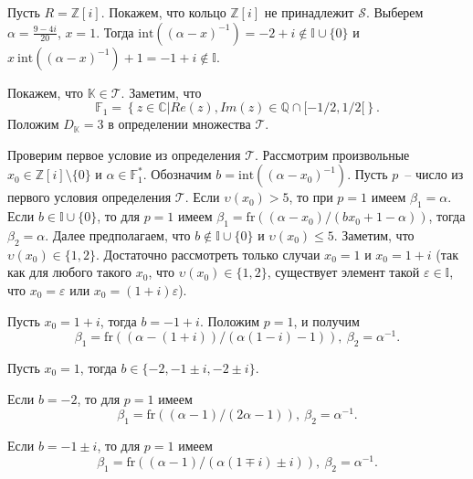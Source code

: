 \documentclass[_00_dissertation.tex]{subfiles}
\begin{document}
\begin{example}\label{example:Z[i]}
    Пусть $R = \mathbb{Z}[i]$.
    Покажем, что кольцо $\mathbb{Z}[i]$ не принадлежит $\mathcal{S}.$
    Выберем $\alpha=\frac{9-4i}{20}$, $x=1$.
    Тогда $\textrm{int}((\alpha-x)^{-1})=-2+i \notin \mathbb{I} \cup \{0\}$ и $x \ \textrm{int}((\alpha-x)^{-1})+1=-1+i \notin \mathbb{I}.$

    Покажем, что $\mathbb{K}\in\mathcal{T}$.
    Заметим, что
    \begin{equation*}
        \mathbb{F}_1 = \left\{
            z \in \mathbb{C} | Re(z), Im(z) \in \mathbb{Q} \cap [-1/2,1/2[
        \right\}.
    \end{equation*}
    Положим $D_{\mathbb{K}}=3$ в определении множества $\mathcal{T}$.

    Проверим первое условие из определения $\mathcal{T}$.
    Рассмотрим произвольные $x_0\in\mathbb{Z}[i]\setminus\{0\}$ и $\alpha\in\mathbb{F}^*_1$.
    Обозначим $b=\textrm{int}((\alpha-x_0)^{-1})$.
    Пусть $p$~-- число из первого условия определения $\mathcal{T}$.
    Если $\upsilon(x_0)>5$, то при $p=1$ имеем $\beta_1=\alpha$.
    Если $b\in\mathbb{I}\cup\{0\}$, то для $p=1$ имеем $\beta_1=\textrm{fr}((\alpha-x_0)/(bx_0+1-\alpha))$, тогда $\beta_2=\alpha$.
    Далее предполагаем, что $b\not\in\mathbb{I}\cup\{0\}$ и $\upsilon(x_0)\le 5$.
    Заметим, что $\upsilon(x_0)\in\{1,2\}$.
    Достаточно рассмотреть только случаи $x_0=1$ и $x_0=1+i$ (так как для любого такого $x_0$, что $\upsilon(x_0)\in\{1,2\}$, существует элемент такой $\varepsilon\in\mathbb{I}$, что $x_0=\varepsilon$ или $x_0=(1+i)\varepsilon$).

    Пусть $x_0=1+i$, тогда $b=-1+i$.
    Положим $p=1$, и получим
    \begin{equation*}
        \beta_1=\textrm{fr}((\alpha-(1+i))/(\alpha(1-i)-1)),\ \beta_2=\alpha^{-1}.
    \end{equation*}

    Пусть $x_0=1$, тогда $b\in\{-2,-1\pm i,-2\pm i\}$.

    Если $b=-2$, то для $p=1$ имеем
    \begin{equation*}
        \beta_1=\textrm{fr}((\alpha-1)/(2\alpha-1)),\ \beta_2=\alpha^{-1}.
    \end{equation*}

    Если $b=-1\pm i$, то для $p=1$ имеем
    \begin{equation*}
        \beta_1=\textrm{fr}((\alpha-1)/(\alpha(1\mp i)\pm i)),\ \beta_2=\alpha^{-1}.
    \end{equation*}


\end{example}
\end{document}
